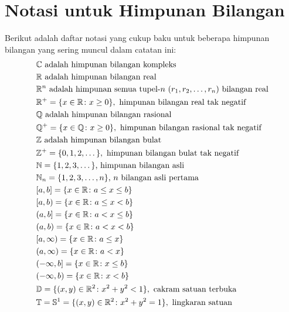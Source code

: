   \vfill\eject
{}
\section*{Notasi untuk Himpunan Bilangan}\label{C0009} %
Berikut adalah daftar notasi yang cukup baku untuk beberapa himpunan bilangan yang sering
muncul dalam catatan ini:
\begin{align*}
 &\C \text{ adalah himpunan bilangan kompleks} \\
 &\R \text{ adalah himpunan bilangan real} \\
 &\R^n \text{ adalah himpunan semua tupel-$n$ $(r_1,r_2,\dots,r_n)$ bilangan real} \\
 &\R^+ = \{x \in \R\colon x \ge 0\}, \text{ himpunan bilangan real tak negatif} \\ %
 &\Q \text{ adalah himpunan bilangan rasional} \\
 &\Q^+ = \{x \in \Q\colon x \ge 0\}, \text{ himpunan bilangan rasional tak negatif} \\ %
 &\Z \text{ adalah himpunan bilangan bulat} \\
 &\Z^+ = \{0,1,2,\dots\}, \text{ himpunan bilangan bulat tak negatif} \\ %
 &\N = \{1,2,3,\dots\}\text{, himpunan bilangan asli} \\
 &\N_n = \{1,2,3,\dots,n\}\text{, $n$ bilangan asli pertama} \\ %
 &[a,b] = \{x \in \R\colon a \le x \le b\} \\
 &[a,b) = \{x \in \R\colon a \le x < b\} \\
 &(a,b] = \{x \in \R\colon a < x \le b\} \\
 &(a,b) = \{x \in \R\colon a < x < b\} \\
 &[a,\infty) = \{x \in \R\colon a \le x\} \\
 &(a,\infty) = \{x \in \R\colon a < x\} \\
 &(-\infty,b] = \{x \in \R\colon x \le b\} \\
 &(-\infty,b) = \{x \in \R\colon  x < b\} \\
\index{cakram!satuan terbuka}%
 &\Di = \{(x,y) \in \R^2\colon x^2 + y^2 < 1\},\text{ cakram satuan terbuka} \\
 &\T = \Sp^1 = \{(x,y) \in \R^2\colon x^2 + y^2 = 1\},\text{ lingkaran satuan} \\
\end{align*}



